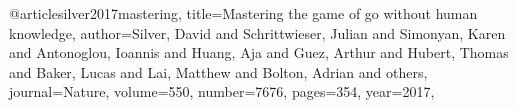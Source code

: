  @article{silver2017mastering,
title={Mastering the game of go without human knowledge},
author={Silver, David and Schrittwieser, Julian and Simonyan, Karen and Antonoglou, Ioannis and Huang, Aja and Guez, Arthur and Hubert, Thomas and Baker, Lucas and Lai, Matthew and Bolton, Adrian and others},
journal={Nature},
volume={550},
number={7676},
pages={354},
year={2017},
}

